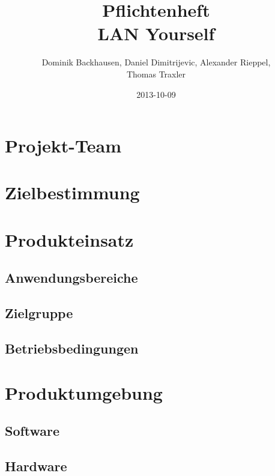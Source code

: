 \documentclass[a4paper,12pt]{scrreprt}
\begin{document}
\author{Dominik Backhausen, Daniel Dimitrijevic, Alexander Rieppel,\\ Thomas Traxler}
\title{Pflichtenheft\\ LAN Yourself}
\date{2013-10-09}
\maketitle
\tableofcontents

\chapter{Projekt-Team}
	
	
	
\chapter{Zielbestimmung}
	
	
	
\chapter{Produkteinsatz}
	
	\section{Anwendungsbereiche}
	 	
		
		
		
	\section{Zielgruppe}
		
		
	\section{Betriebsbedingungen}
		
		
\chapter{Produktumgebung}
	
	\section{Software}
		
		
		
	\section{Hardware}
		
\end{document}
